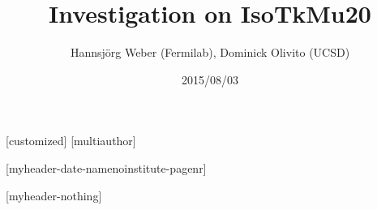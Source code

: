 




[customized]%
[multiauthor]
\title[]{Investigation on IsoTkMu20} %

\author{Hannsj\"org Weber (Fermilab), Dominick Olivito (UCSD)} %
\date{2015/08/03} %
[myheader-date-namenoinstitute-pagenr]



{
[myheader-nothing]
\begin{frame}
\titlepage %
\end{frame}

}



